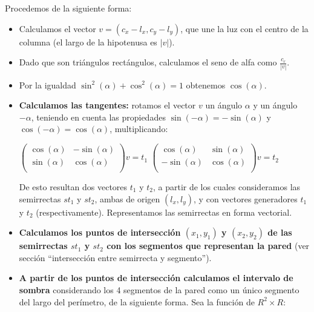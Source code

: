 Procedemos de la siguiente forma:

\begin{itemize}
\item Calculamos el vector $v = (c_x-l_x, c_y-l_y)$, que une la luz con el centro de la columna
      (el largo de la hipotenusa es $|v|$).

\item Dado que son triángulos rectángulos, calculamos el seno de alfa como
$\displaystyle\frac{c_r}{|v|}$.

\item Por la igualdad $\sin^2(\alpha) + \cos^2(\alpha) = 1$ obtenemos $\cos(\alpha)$.

\item \textbf{Calculamos las tangentes:} rotamos el vector $v$ un ángulo $\alpha$ y un ángulo
$-\alpha$, teniendo en cuenta las propiedades $\sin(-\alpha) = -\sin(\alpha)$ y
$\cos(-\alpha) = \cos(\alpha)$, multiplicando:

\vspace{0.2cm}
\begin{center}
$\left(
\begin{array}{cc}
\cos(\alpha) & -\sin(\alpha) \\
\sin(\alpha) & \cos(\alpha) \\
\end{array}
\right)
v = t_1$
\hspace{1cm}
$\left(
\begin{array}{cc}
\cos(\alpha) & \sin(\alpha) \\
-\sin(\alpha) & \cos(\alpha) \\
\end{array}
\right)  
v = t_2$
\end{center}
\vspace{0.2cm}

De esto resultan dos vectores $t_1$ y $t_2$, a partir de los cuales
consideramos las semirrectas $st_1$ y $st_2$, ambas de origen $(l_x, l_y)$, y
con vectores generadores $t_1$ y $t_2$ (respectivamente). Representamos las
semirrectas en forma vectorial.

\item \textbf{Calculamos los puntos de intersección $(x_1, y_1)$ y $(x_2, y_2)$ de las semirrectas
$st_1$ y $st_2$ con los segmentos que representan la pared} (ver sección
``intersección entre semirrecta y segmento'').

\item \textbf{A partir de los puntos de intersección calculamos el intervalo de sombra}
considerando los 4 segmentos de la pared como un único segmento del largo del perímetro,
de la siguiente forma. Sea la función de $R^2 \times R$:


\end{itemize}
